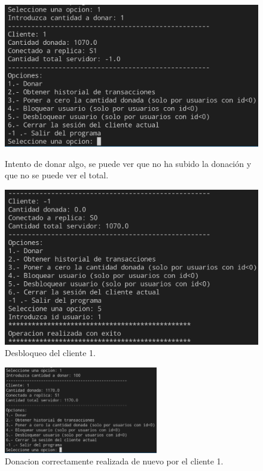 \documentclass{article}
\begin{document}
\begin{figure}[H]
    \centering
    \begin{minipage}[H]{0.45\textwidth}
        \centering
        \includegraphics[width=\textwidth]{imagenes/bloqueo/3.png}
        \caption{Intento de donar algo, se puede ver que no ha subido la donación y que no se puede ver el total.}
    \end{minipage}
    \hfill
    \begin{minipage}[H]{0.45\textwidth}
        \centering
        \includegraphics[width=\textwidth]{imagenes/bloqueo/4.png}
        \caption{Desbloqueo del cliente 1.}
    \end{minipage}
\end{figure}

\begin{figure}[H]
    \centering
    \includegraphics[width=0.6\textwidth]{imagenes/bloqueo/5.png}
    \caption{Donacion correctamente realizada de nuevo por el cliente 1.}
\end{figure}
\end{document}
